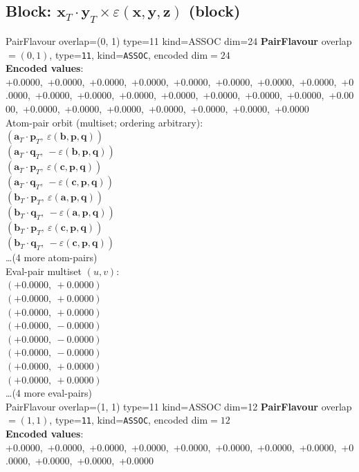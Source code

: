 \documentclass[a4paper,11pt]{article}
\newcommand{\fpbeomcfokjooi}[2]{\mathbf{#1}_T \cdot \mathbf{#2}_T}
\newcommand{\kblbmcpggoncpf}[3]{\varepsilon(\mathbf{#1},\mathbf{#2},\mathbf{#3})}
\begin{document}
\subsection{Block: $\fpbeomcfokjooi{x}{y} \times \kblbmcpggoncpf{x}{y}{z}$  (block)}
    PairFlavour  overlap=(0, 1)  type=11  kind=ASSOC  dim=24
\textbf{PairFlavour} overlap$=(0, 1)$, type=\texttt{11}, kind=\texttt{ASSOC}, encoded dim$=24$\\
\textbf{      Encoded values}: +0.0000,\ +0.0000,\ +0.0000,\ +0.0000,\ +0.0000,\ +0.0000,\ +0.0000,\ +0.0000,\ +0.0000,\ +0.0000,\ +0.0000,\ +0.0000,\ +0.0000,\ +0.0000,\ +0.0000,\ +0.0000,\ +0.0000,\ +0.0000,\ +0.0000,\ +0.0000,\ +0.0000,\ +0.0000,\ +0.0000,\ +0.0000\\
\quad Atom-pair orbit (multiset; ordering arbitrary):\\
$(\fpbeomcfokjooi{a}{p},\ \kblbmcpggoncpf{b}{p}{q})$\\
$(\fpbeomcfokjooi{a}{q},\ -\kblbmcpggoncpf{b}{p}{q})$\\
$(\fpbeomcfokjooi{a}{p},\ \kblbmcpggoncpf{c}{p}{q})$\\
$(\fpbeomcfokjooi{a}{q},\ -\kblbmcpggoncpf{c}{p}{q})$\\
$(\fpbeomcfokjooi{b}{p},\ \kblbmcpggoncpf{a}{p}{q})$\\
$(\fpbeomcfokjooi{b}{q},\ -\kblbmcpggoncpf{a}{p}{q})$\\
$(\fpbeomcfokjooi{b}{p},\ \kblbmcpggoncpf{c}{p}{q})$\\
$(\fpbeomcfokjooi{b}{q},\ -\kblbmcpggoncpf{c}{p}{q})$\\
\quad \ldots (4 more atom-pairs)\\
\quad Eval-pair multiset $(u, v)$:\\
$(+0.0000,\ +0.0000)$\\
$(+0.0000,\ +0.0000)$\\
$(+0.0000,\ +0.0000)$\\
$(+0.0000,\ -0.0000)$\\
$(+0.0000,\ -0.0000)$\\
$(+0.0000,\ -0.0000)$\\
$(+0.0000,\ +0.0000)$\\
$(+0.0000,\ +0.0000)$\\
\quad \ldots (4 more eval-pairs)\\
    PairFlavour  overlap=(1, 1)  type=11  kind=ASSOC  dim=12
\textbf{PairFlavour} overlap$=(1, 1)$, type=\texttt{11}, kind=\texttt{ASSOC}, encoded dim$=12$\\
\textbf{      Encoded values}: +0.0000,\ +0.0000,\ +0.0000,\ +0.0000,\ +0.0000,\ +0.0000,\ +0.0000,\ +0.0000,\ +0.0000,\ +0.0000,\ +0.0000,\ +0.0000\\
\end{document}
